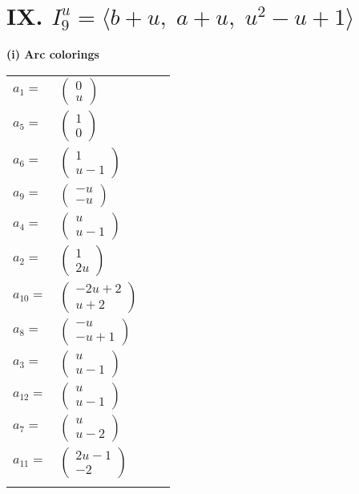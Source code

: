 \documentclass[1p]{elsarticle_modified}
\theoremstyle{definition}
\begin{document}
\centering \section*{IX. $I^u_{9}= \langle b+u,\;a+u,\;u^2- u+1 \rangle$}
\flushleft \textbf{(i) Arc colorings}\\
\begin{tabular}{m{7pt} m{180pt} m{7pt} m{180pt} }
\flushright $a_{1}=$&$\begin{pmatrix}0\\u\end{pmatrix}$ \\
\flushright $a_{5}=$&$\begin{pmatrix}1\\0\end{pmatrix}$ \\
\flushright $a_{6}=$&$\begin{pmatrix}1\\u-1\end{pmatrix}$ \\
\flushright $a_{9}=$&$\begin{pmatrix}- u\\- u\end{pmatrix}$ \\
\flushright $a_{4}=$&$\begin{pmatrix}u\\u-1\end{pmatrix}$ \\
\flushright $a_{2}=$&$\begin{pmatrix}1\\2 u\end{pmatrix}$ \\
\flushright $a_{10}=$&$\begin{pmatrix}-2 u+2\\u+2\end{pmatrix}$ \\
\flushright $a_{8}=$&$\begin{pmatrix}- u\\- u+1\end{pmatrix}$ \\
\flushright $a_{3}=$&$\begin{pmatrix}u\\u-1\end{pmatrix}$ \\
\flushright $a_{12}=$&$\begin{pmatrix}u\\u-1\end{pmatrix}$ \\
\flushright $a_{7}=$&$\begin{pmatrix}u\\u-2\end{pmatrix}$ \\
\flushright $a_{11}=$&$\begin{pmatrix}2 u-1\\-2\end{pmatrix}$\\&\end{tabular}
\end{document}
